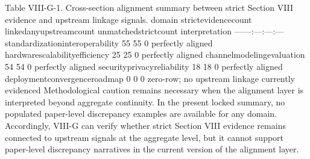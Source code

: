 {}Table VIII-G-1. Cross-section alignment summary between strict Section VIII evidence and upstream linkage signals.\markdownRendererParagraphSeparator
{}\markdownRendererPipe{} domain \markdownRendererPipe{} strict\markdownRendererUnderscore{}evidence\markdownRendererUnderscore{}count \markdownRendererPipe{} linked\markdownRendererUnderscore{}any\markdownRendererUnderscore{}upstream\markdownRendererUnderscore{}count \markdownRendererPipe{} unmatched\markdownRendererUnderscore{}strict\markdownRendererUnderscore{}count \markdownRendererPipe{} interpretation \markdownRendererPipe{}\markdownRendererSoftLineBreak
{}\markdownRendererPipe{}---\markdownRendererPipe{}---:\markdownRendererPipe{}---:\markdownRendererPipe{}---:\markdownRendererPipe{}---\markdownRendererPipe{}\markdownRendererSoftLineBreak
{}\markdownRendererPipe{} standardization\markdownRendererUnderscore{}interoperability \markdownRendererPipe{} 55 \markdownRendererPipe{} 55 \markdownRendererPipe{} 0 \markdownRendererPipe{} perfectly aligned \markdownRendererPipe{}\markdownRendererSoftLineBreak
{}\markdownRendererPipe{} hardware\markdownRendererUnderscore{}scalability\markdownRendererUnderscore{}efficiency \markdownRendererPipe{} 25 \markdownRendererPipe{} 25 \markdownRendererPipe{} 0 \markdownRendererPipe{} perfectly aligned \markdownRendererPipe{}\markdownRendererSoftLineBreak
{}\markdownRendererPipe{} channel\markdownRendererUnderscore{}modeling\markdownRendererUnderscore{}evaluation \markdownRendererPipe{} 54 \markdownRendererPipe{} 54 \markdownRendererPipe{} 0 \markdownRendererPipe{} perfectly aligned \markdownRendererPipe{}\markdownRendererSoftLineBreak
{}\markdownRendererPipe{} security\markdownRendererUnderscore{}privacy\markdownRendererUnderscore{}reliability \markdownRendererPipe{} 18 \markdownRendererPipe{} 18 \markdownRendererPipe{} 0 \markdownRendererPipe{} perfectly aligned \markdownRendererPipe{}\markdownRendererSoftLineBreak
{}\markdownRendererPipe{} deployment\markdownRendererUnderscore{}convergence\markdownRendererUnderscore{}roadmap \markdownRendererPipe{} 0 \markdownRendererPipe{} 0 \markdownRendererPipe{} 0 \markdownRendererPipe{} zero-row; no upstream linkage currently evidenced \markdownRendererPipe{}\markdownRendererParagraphSeparator
{}Methodological caution remains necessary when the alignment layer is interpreted beyond aggregate continuity. In the present locked summary, no populated paper-level discrepancy examples are available for any domain. Accordingly, VIII-G can verify whether strict Section VIII evidence remains connected to upstream signals at the aggregate level, but it cannot support paper-level discrepancy narratives in the current version of the alignment layer.\markdownRendererParagraphSeparator
